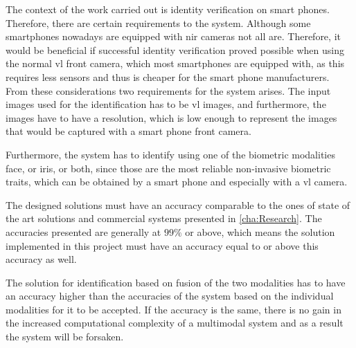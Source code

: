 The context of the work carried out is identity verification on smart phones. Therefore, there are certain requirements to the system. Although some smartphones nowadays are equipped with \gls{nir} cameras not all are. Therefore, it would be beneficial if successful identity verification proved possible when using the normal \gls{vl} front camera, which most smartphones are equipped with, as this requires less sensors and thus is cheaper for the smart phone manufacturers. From these considerations two requirements for the system arises. The input images used for the identification has to be \gls{vl} images, and furthermore, the images have to have a resolution, which is low enough to represent the images that would be captured with a smart phone front camera.

Furthermore, the system has to identify using one of the biometric modalities face, or iris, or both, since those are the most reliable non-invasive biometric traits, which can be obtained by a smart phone and especially with a \gls{vl} camera. 

The designed solutions must have an accuracy comparable to the ones of state of the art solutions and commercial systems presented in \autoref{cha:Research}. The accuracies presented are generally at $99\%$ or above, which means the solution implemented in this project must have an accuracy equal to or above this accuracy as well. 

The solution for identification based on fusion of the two modalities has to have an accuracy higher than the accuracies of the system based on the individual modalities for it to be accepted. If the accuracy is the same, there is no gain in the increased computational complexity of a multimodal system and as a result the system will be forsaken. 

